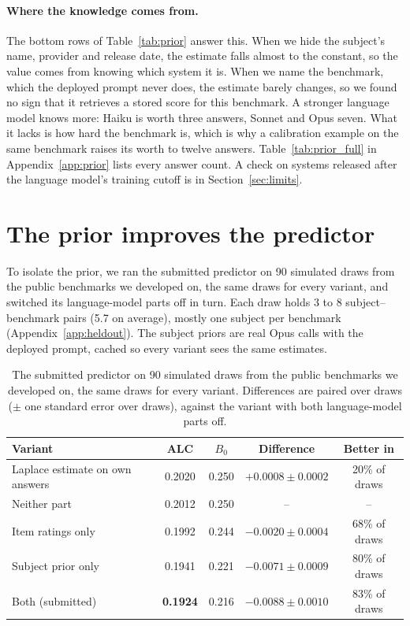 \documentclass{article}
\begin{document}
\paragraph{Where the knowledge comes from.} The bottom rows of Table~\ref{tab:prior} answer this. When we hide the subject's name, provider and release date, the estimate falls almost to the constant, so the value comes from knowing which system it is. When we name the benchmark, which the deployed prompt never does, the estimate barely changes, so we found no sign that it retrieves a stored score for this benchmark. A stronger language model knows more: Haiku is worth three answers, Sonnet and Opus seven. What it lacks is how hard the benchmark is, which is why a calibration example on the same benchmark raises its worth to twelve answers. Table~\ref{tab:prior_full} in Appendix~\ref{app:prior} lists every answer count. A check on systems released after the language model's training cutoff is in Section~\ref{sec:limits}.

\section{The prior improves the predictor}
\label{sec:ablate}

To isolate the prior, we ran the submitted predictor on 90 simulated draws from the public benchmarks we developed on, the same draws for every variant, and switched its language-model parts off in turn. Each draw holds 3 to 8 subject--benchmark pairs (5.7 on average), mostly one subject per benchmark (Appendix~\ref{app:heldout}). The subject priors are real Opus calls with the deployed prompt, cached so every variant sees the same estimates.

\begin{table}[t]
\centering
\caption{The submitted predictor on 90 simulated draws from the public benchmarks we developed on, the same draws for every variant. Differences are paired over draws ($\pm$ one standard error over draws), against the variant with both language-model parts off.}
\label{tab:ablate}
\small
\begin{tabular}{lcccc}
\toprule
Variant & ALC & $B_0$ & Difference & Better in \\
\midrule
Laplace estimate on own answers & 0.2020 & 0.250 & $+0.0008 \pm 0.0002$ & 20\% of draws \\
Neither part & 0.2012 & 0.250 & -- & -- \\
Item ratings only & 0.1992 & 0.244 & $-0.0020 \pm 0.0004$ & 68\% of draws \\
Subject prior only & 0.1941 & 0.221 & $-0.0071 \pm 0.0009$ & 80\% of draws \\
Both (submitted) & \textbf{0.1924} & 0.216 & $-0.0088 \pm 0.0010$ & 83\% of draws \\
\bottomrule
\end{tabular}
\end{table}
\end{document}
